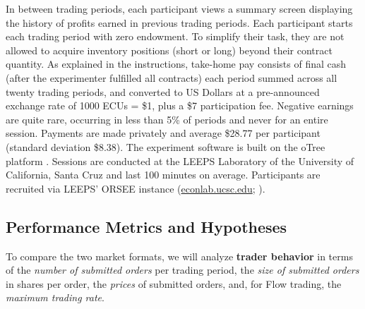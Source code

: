 \documentclass[12pt]{article}
\begin{document}
In between trading periods, each participant views a summary screen displaying the history of profits earned in previous trading periods.
Each participant starts each trading period with zero endowment. 
To simplify their task, they are not allowed to acquire inventory positions 
(short or long) beyond their contract quantity.
As explained in the instructions,
take-home pay consists of final cash
(after the experimenter fulfilled all contracts) each period summed across all twenty trading periods, and converted to US Dollars at a pre-announced exchange rate of 1000 ECUs = \$1, plus a \$7 participation fee. 
Negative earnings are quite rare, occurring in less than 5\% of periods and never for an entire session. 
Payments are made privately and average \$28.77 per participant %
(standard deviation \$8.38).
The experiment software is built on the oTree platform \citep{otree}. Sessions are conducted at the LEEPS Laboratory of the University of California, Santa Cruz and last 100 minutes on average. Participants are recruited via LEEPS' ORSEE instance (\hyperlink{https://econlab.ucsc.edu/public/}{econlab.ucsc.edu}; \cite{Greiner2015}).



\subsection{Performance Metrics and Hypotheses}\label{sect:metricHyps}
\label{sec:hypotheses}

To compare the two market formats, we will analyze \textbf{trader behavior} in terms of 
the \textit{number of submitted orders} per trading period, 
the \textit{size of submitted orders}  in shares per order,
the \textit{prices} of submitted orders, and, for Flow trading, 
the \textit{maximum trading rate}.
\end{document}
